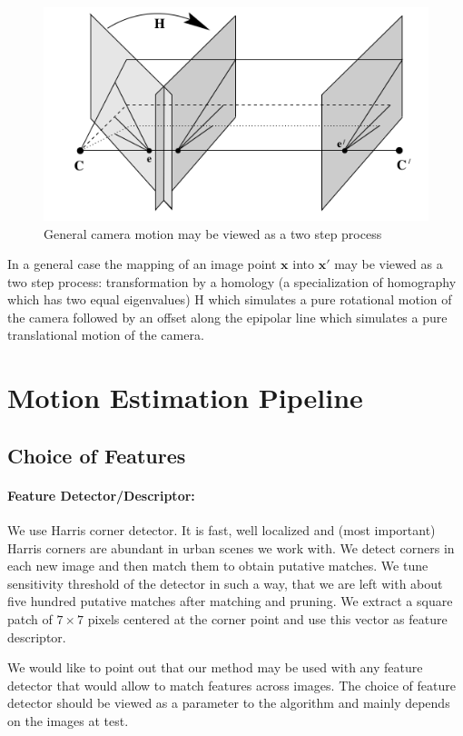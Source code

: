 \documentclass{bmvc2k}
\begin{document}
\begin{figure}[h]
\includegraphics[scale=.3]{general_camera_motion}
\centering
\caption{General camera motion may be viewed as a two step process}
\end{figure}

In a general case the mapping of an image point $\mathbf{x}$ into $\mathbf{x}'$ may be viewed as a two step process: transformation by a homology (a specialization of homography which has two equal eigenvalues) $\mathrm{H}$ which simulates a pure rotational motion of the camera followed by an offset along the epipolar line which simulates a pure translational motion of the camera.

\section{Motion Estimation Pipeline}

\subsection{Choice of Features}
\paragraph{Feature Detector/Descriptor:} We use Harris
\cite{Harris1988} corner detector. It is fast, well localized and
(most important) Harris corners are abundant in urban scenes we work
with. We detect corners in each new image and then match them to
obtain putative matches.  We tune sensitivity threshold of the
detector in such a way, that we are left with about five hundred
putative matches after matching and pruning.  We extract a square
patch of $7\times 7$ pixels centered at the corner point and use this
vector as feature descriptor.

We would like to point out that our method may be used with any
feature detector that would allow to match features across images. The
choice of feature detector should be viewed as a parameter to the
algorithm and mainly depends on the images at test.
\end{document}
